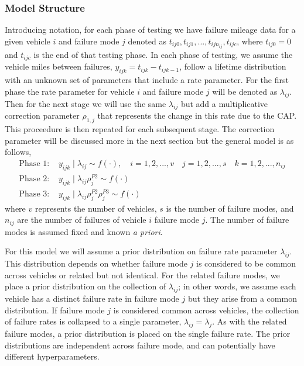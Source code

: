 \documentclass[12pt]{article}
\begin{document}
\subsubsection{Model Structure}
Introducing notation, for each phase of testing we have failure mileage data for
a given vehicle $i$ and failure mode $j$ denoted as $t_{ij0}, t_{ij1},...,
t_{ijn_{ij}}, t_{ijc}$, where $t_{ij0} = 0$ and $t_{ijc}$ is the end of that
testing phase. In each phase of testing, we assume the vehicle miles between
failures, $y_{ijk} = t_{ijk} - t_{ijk-1}$, follow a lifetime distribution with
an unknown set of parameters that include a rate parameter.  For the first phase
the rate parameter for vehicle $i$ and failure mode $j$ will be denoted as
$\lambda_{ij}$.  Then for the next stage we will use the same $\lambda_{ij}$ but
add a multiplicative correction parameter $\rho_{1,j}$ that represents the
change in this rate due to the CAP.  This proceedure is then repeated for each
subsequent stage.  The correction parameter will be discussed more in the next
section but the general model is as follows,
\begin{align*}
\text{Phase 1: }&y_{ijk}\mid\lambda_{ij}\sim f(\cdot), \quad i = 1,2,...,v \quad
j=1,2,...,s \quad k=1,2,...,n_{ij}\\
\text{Phase 2: }&y_{ijk}\mid\lambda_{ij}\rho_{j}^{P2}\sim f(\cdot) \\
\text{Phase 3: }&y_{ijk}\mid\lambda_{ij}\rho_{j}^{P2}\rho_{j}^{P3}\sim f(\cdot)
\end{align*}
where $v$ represents the number of vehicles, $s$ is the number of failure modes,
and $n_{ij}$ are the number of failures of vehicle $i$ failure mode $j$. The
number of failure modes is assumed fixed and known \textit{a priori}.

For this model we will assume a prior distribution on failure rate parameter
$\lambda_{ij}$.  This distribution depends on whether failure mode $j$ is
considered to be common across vehicles or related but not identical. For the
related failure modes, we place a prior distribution on the collection of
$\lambda_{ij}$; in other words, we assume each vehicle has a distinct failure
rate in failure mode $j$ but they arise from a common distribution.  If failure
mode $j$ is considered common across vehicles, the collection of failure rates
is collapsed to a single parameter, $\lambda_{ij} = \lambda_j$. As with the
related failure modes, a prior distribution is placed on the single failure
rate. The prior distributions are independent across failure mode, and can
potentially have different hyperparameters.
\end{document}
